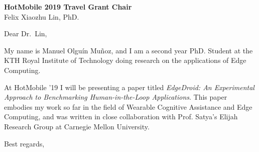 \documentclass[english]{kthletter}
\date{Stockholm, \today}
\begin{document}
\begin{letter}%
  {
      \textbf{HotMobile 2019 Travel Grant Chair}\\
      Felix Xiaozhu Lin, PhD.
  }
\opening{Dear Dr.~Lin,}

My name is Manuel Olguín Muñoz, and I am a second year PhD. Student at the KTH Royal Institute of Technology doing research on the applications of Edge Computing.

At HotMobile '19 I will be presenting a paper titled \emph{EdgeDroid: An Experimental Approach to Benchmarking Human-in-the-Loop Applications}. 
This paper embodies my work so far in the field of Wearable Cognitive Assistance and Edge Computing, and was written in close collaboration with Prof. Satya's Elijah Research Group at Carnegie Mellon University.

\closing{Best regards,}



\end{letter}
\end{document}
